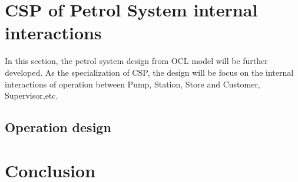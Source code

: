 \section{CSP of Petrol System internal interactions}
In this section, the petrol system design from OCL model will be further developed. As the specialization of CSP, the design will be focus on the internal interactions of operation between Pump, Station, Store and Customer, Supervisor,etc.
\subsection{Operation design}

\section{Conclusion}


